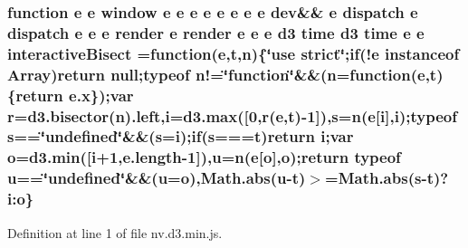 \subsubsection[{interactive\+Bisect}]{\setlength{\rightskip}{0pt plus 5cm}function {\bf e} {\bf e} {\bf window} {\bf e} {\bf e} {\bf e} {\bf e} {\bf e} {\bf e} {\bf e} {\bf e} {\bf dev}\&\& {\bf e} {\bf dispatch} {\bf e} {\bf dispatch} {\bf e} {\bf e} {\bf e} {\bf render} {\bf e} {\bf render} {\bf e} {\bf e} {\bf e} {\bf d3} time {\bf d3} time {\bf e} {\bf e} interactive\+Bisect =function({\bf e},t,{\bf n})\{\char`\"{}use strict\char`\"{};if(!{\bf e} instanceof Array){\bf return} null;typeof n!=\char`\"{}function\char`\"{}\&\&(n=function({\bf e},t)\{{\bf return} {\bf e.\+x}\});var {\bf r}={\bf d3.\+bisector}({\bf n}).left,{\bf i}={\bf d3.\+max}([0,{\bf r}({\bf e},t)-\/1]),s={\bf n}({\bf e}[{\bf i}],{\bf i});typeof s==\char`\"{}undefined\char`\"{}\&\&(s={\bf i});{\bf if}(s===t){\bf return} {\bf i};var {\bf o}={\bf d3.\+min}([{\bf i}+1,e.\+length-\/1]),u={\bf n}({\bf e}[{\bf o}],{\bf o});{\bf return} typeof u==\char`\"{}undefined\char`\"{}\&\&(u={\bf o}),Math.\+abs(u-\/t)$>$=Math.\+abs(s-\/t)?i\+:o\}}\label{nv_8d3_8min_8js_a92ddf1f75b85052e993cb9c156fd897d}


Definition at line 1 of file nv.\+d3.\+min.\+js.

